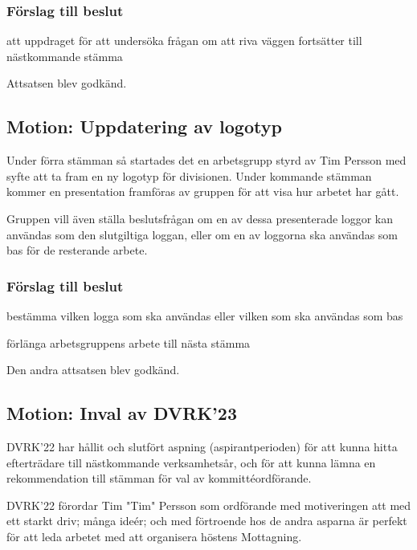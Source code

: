 \documentclass[protokoll]{dvd}
\begin{document}
\subsubsection*{Förslag till beslut}
\begin{attsatser}
    \item att uppdraget för att undersöka frågan om att riva väggen
    fortsätter till nästkommande stämma
\end{attsatser}

Attsatsen blev godkänd.

\subsection*{Motion: Uppdatering av logotyp}
Under förra stämman så startades det en arbetsgrupp styrd av Tim Persson
med syfte att ta fram en ny logotyp för divisionen. Under kommande stämman
kommer en presentation framföras av gruppen för att visa hur arbetet har gått.

Gruppen vill även ställa beslutsfrågan om en av dessa presenterade loggor
kan användas som den slutgiltiga loggan, eller om en av loggorna ska användas som
bas för de resterande arbete.

\subsubsection*{Förslag till beslut}
\begin{attsatser}
    \item bestämma vilken logga som ska användas eller vilken som ska användas som bas 
    \item förlänga arbetsgruppens arbete till nästa stämma
\end{attsatser}

Den andra attsatsen blev godkänd.

\subsection{Motion: Inval av DVRK'23}

DVRK'22 har hållit och slutfört aspning (aspirantperioden) för att kunna hitta efterträdare till nästkommande verksamhetsår, och för att kunna lämna en rekommendation till stämman för val av kommittéordförande.

DVRK'22 förordar Tim "Tim" Persson som ordförande med motiveringen att med ett starkt driv; många ideér; och med förtroende hos de andra asparna är perfekt för att leda arbetet med att organisera höstens Mottagning.
\end{document}
